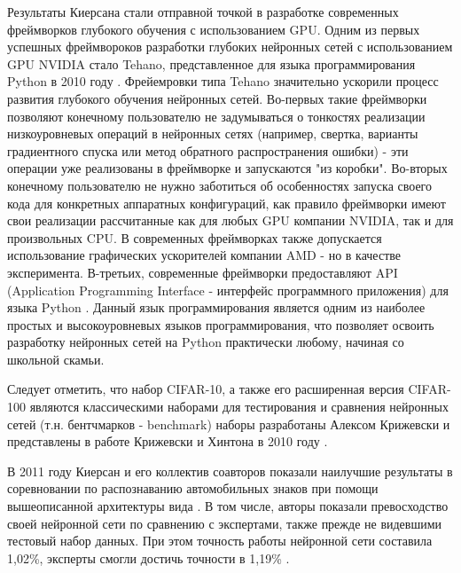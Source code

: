 \documentclass[12pt]{article}
\begin{document}
\begin{sloppypar}
Результаты Киерсана стали отправной точкой в разработке современных фреймворков глубокого обучения с использованием GPU. Одним из первых успешных фреймвороков разработки глубоких нейронных сетей с использованием GPU NVIDIA стало Tehano, представленное для языка программирования Python в 2010 году \cite{bergstra2010theano}. Фрейемровки типа Tehano значительно ускорили процесс развития глубокого обучения нейронных сетей. Во-первых такие фреймворки позволяют конечному пользователю не задумываться о тонкостях реализации низкоуровневых операций в нейронных сетях (например, свертка, варианты градиентного спуска или метод обратного распространения ошибки) - эти операции уже реализованы в фреймворке и запускаются "из коробки". Во-вторых конечному пользователю не нужно заботиться об особенностях запуска своего кода для конкретных аппаратных конфигураций, как правило фреймворки имеют свои реализации рассчитанные как для любых GPU компании NVIDIA, так и для произвольных CPU. В современных фреймворках также допускается использование графических ускорителей компании AMD - но в качестве эксперимента.  В-третьих, современные фреймворки предоставляют API (Application Programming Interface - интерфейс программного приложения) для языка Python \cite{li2020deep}. Данный язык программирования является одним из наиболее простых и высокоуровневых языков программирования, что позволяет освоить разработку нейронных сетей на Python практически любому, начиная со школьной скамьи.

Следует отметить, что набор CIFAR-10, а также его расширенная версия CIFAR-100 являются классическими наборами для тестирования и сравнения нейронных сетей (т.н. бентчмарков - benchmark) наборы разработаны Алексом Крижевски и представлены в работе Крижевски и Хинтона в 2010 году \cite{krizhevsky2010convolutional}. 

В 2011 году  Киерсан и его коллектив соавторов  показали наилучшие результаты в соревновании по распознаванию автомобильных знаков \cite{cirecsan2011committee} при помощи вышеописанной архитектуры вида \cite{ciresan2011flexible}. В том числе, авторы \cite{cirecsan2011committee} показали превосходство своей нейронной сети по сравнению с экспертами, также прежде не видевшими тестовый набор данных. При этом точность работы нейронной сети составила 1,02\%, эксперты смогли достичь точности в 1,19\% \cite {schmidhuber2015deep}. 


\end{sloppypar}
\end{document}
